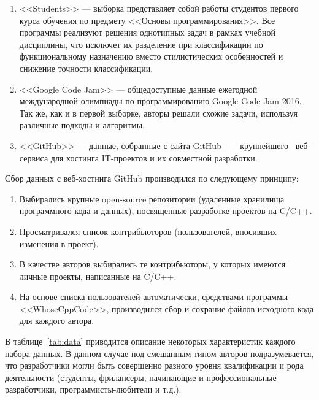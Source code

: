 \begin{enumerate}
 \item <<Students>> --- выборка представляет собой работы студентов первого курса обучения по 
 предмету <<Основы программирования>>. Все программы реализуют решения однотипных задач в рамках учебной 
 дисциплины, что исключет их разделение при классификации по функциональному назначению вместо 
 стилистических особенностей и снижение точности классификации. 
 \item <<Google Code Jam>> --- общедоступные данные ежегодной международной олимпиады по программированию Google Code Jam 
 2016.~\cite{GoogleCodeJam} Так же, как и в первой выборке, авторы решали схожие задачи, используя различные
 подходы и алгоритмы. 
\item <<GitHub>> --- данные, собранные с сайта GitHub~\cite{GitHub} --- крупнейшего~\cite{GH_domain} 
веб-сервиса для хостинга IT-проектов и их совместной разработки. 
\end{enumerate}


Сбор данных с веб-хостинга GitHub производился по следующему принципу: 
\begin{enumerate}
 \item Выбирались крупные open-source репозитории (удаленные хранилища программного кода и данных),  
 посвященные разработке проектов на C/C++.
 \item Просматривался список контрибьюторов (пользователей, вносивших изменения в проект).
 \item В качестве авторов выбирались те контрибьюторы, у которых имеются личные проекты, написанные 
 на C/C++.
 \item На основе списка пользователей автоматически, средствами программы <<WhoseCppCode>>, производился
 сбор и сохрание файлов исходного кода для каждого автора. 
\end{enumerate}

В таблице~\ref{tab:data} приводится описание некоторых характеристик каждого набора данных.
В данном случае под смешанным типом авторов подразумевается, что разработчики могли быть совершенно
разного уровня квалификации и рода деятельности (студенты, фрилансеры, начинающие и 
профессиональные разработчики, программисты-любители и т.д.).

